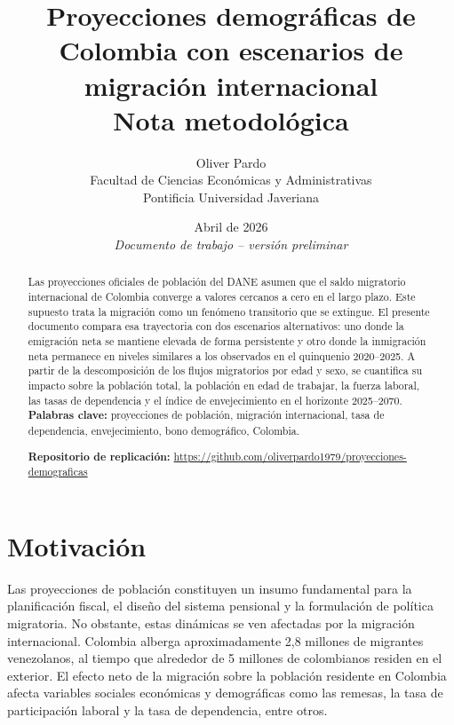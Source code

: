 \documentclass[12pt,a4paper]{article}
\title{\textbf{Proyecciones demográficas de Colombia con escenarios de migración internacional} \\ 
\vspace{0.3cm} \large Nota metodológica}
\author{Oliver Pardo \\ 
Facultad de Ciencias Económicas y Administrativas \\ 
Pontificia Universidad Javeriana}
\date{Abril de 2026 \\ \vspace{0.2cm} \small \textit{Documento de trabajo -- versión preliminar}}
\begin{document}
\maketitle
\thispagestyle{fancy}

\begin{abstract}
\noindent Las proyecciones oficiales de población del DANE asumen que el saldo migratorio internacional de Colombia converge a valores cercanos a cero en el largo plazo. Este supuesto trata la migración como un fenómeno transitorio que se extingue. El presente documento compara esa trayectoria con dos escenarios alternativos: uno donde la emigración neta se mantiene elevada de forma persistente y otro donde la inmigración neta permanece en niveles similares a los observados en el quinquenio 2020--2025. A partir de la descomposición de los flujos migratorios por edad y sexo, se cuantifica su impacto sobre la población total, la población en edad de trabajar, la fuerza laboral, las tasas de dependencia y el índice de envejecimiento en el horizonte 2025--2070. \\[0.3cm]
\noindent \textbf{Palabras clave:} proyecciones de población, migración internacional, tasa de dependencia, envejecimiento, bono demográfico, Colombia.

\vspace{0.2cm}
\noindent \textbf{Repositorio de replicación:} \url{https://github.com/oliverpardo1979/proyecciones-demograficas}
\end{abstract}

\newpage
\tableofcontents
\newpage

\section{Motivación}

Las proyecciones de población constituyen un insumo fundamental para la planificación fiscal, el diseño del sistema pensional y la formulación de política migratoria. No obstante, estas dinámicas se ven afectadas por la migración internacional. Colombia alberga aproximadamente 2,8 millones de migrantes venezolanos, al tiempo que alrededor de 5 millones de colombianos residen en el exterior. El efecto neto de la migración sobre la población residente en Colombia afecta variables sociales económicas y demográficas como las remesas, la tasa de participación laboral y la tasa de dependencia, entre otros.
\end{document}
